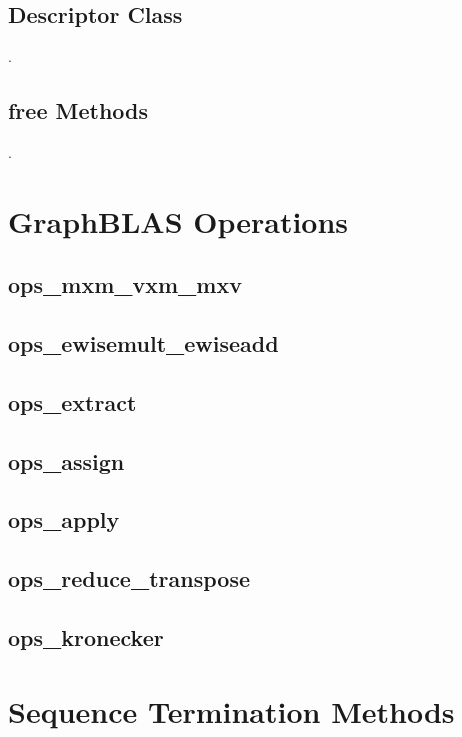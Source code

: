 \subsection{Descriptor Class}

.


\subsection{{\sf free} Methods}

.

\section{GraphBLAS Operations}

\subsection{ops\_mxm\_vxm\_mxv}
\subsection{ops\_ewisemult\_ewiseadd}
\subsection{ops\_extract}
\subsection{ops\_assign} 
\subsection{ops\_apply}
\subsection{ops\_reduce\_transpose}
\subsection{ops\_kronecker}

\section{Sequence Termination Methods}